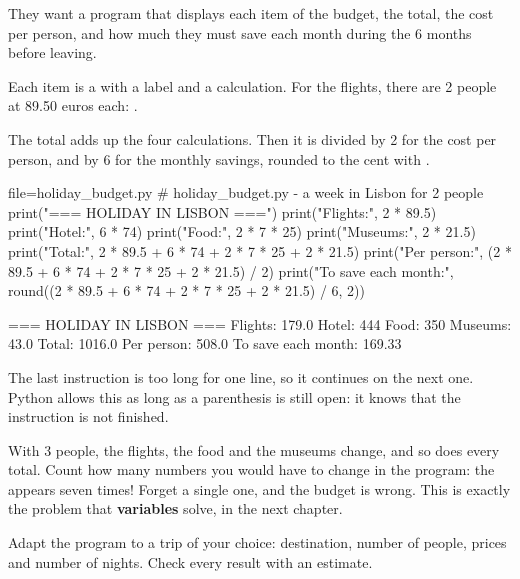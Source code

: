 They want a program that displays each item of the budget, the total, the cost per person, and how
much they must save each month during the 6 months before leaving.

Each item is a  with a label and a calculation. For the flights, there are 2 people at
89.50 euros each: .

The total adds up the four calculations. Then it is divided by 2 for the cost per person, and by 6
for the monthly savings, rounded to the cent with .

\begin{code}{file=holiday_budget.py}
# holiday_budget.py - a week in Lisbon for 2 people
print("=== HOLIDAY IN LISBON ===")
print("Flights:", 2 * 89.5)
print("Hotel:", 6 * 74)
print("Food:", 2 * 7 * 25)
print("Museums:", 2 * 21.5)
print("Total:", 2 * 89.5 + 6 * 74 + 2 * 7 * 25 + 2 * 21.5)
print("Per person:", (2 * 89.5 + 6 * 74 + 2 * 7 * 25 + 2 * 21.5) / 2)
print("To save each month:",
      round((2 * 89.5 + 6 * 74 + 2 * 7 * 25 + 2 * 21.5) / 6, 2))
\end{code}
\begin{sortie}
=== HOLIDAY IN LISBON ===
Flights: 179.0
Hotel: 444
Food: 350
Museums: 43.0
Total: 1016.0
Per person: 508.0
To save each month: 169.33
\end{sortie}

The last instruction is too long for one line, so it continues on the next one. Python allows this
as long as a parenthesis is still open: it knows that the instruction is not finished.

With 3 people, the flights, the food and the museums change, and so does every total. Count how many
numbers you would have to change in the program: the  appears seven times! Forget a single one,
and the budget is wrong. This is exactly the problem that \textbf{variables} solve, in the next
chapter.

\begin{atoi}
Adapt the program to a trip of your choice: destination, number of people, prices and number of
nights. Check every result with an estimate.
\end{atoi}


